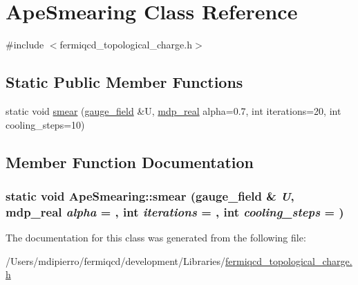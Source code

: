 \hypertarget{class_ape_smearing}{
\section{ApeSmearing Class Reference}
\label{class_ape_smearing}
}


{\ttfamily \#include $<$fermiqcd\_\-topological\_\-charge.h$>$}\subsection*{Static Public Member Functions}
\begin{DoxyCompactItemize}
\item 
static void \hyperlink{class_ape_smearing_ab3f701b052e30d858bac389f639ed9a0}{smear} (\hyperlink{classgauge__field}{gauge\_\-field} \&U, \hyperlink{mdp__global__vars_8h_a049e4c1d4e74d644878a42f9909463e4}{mdp\_\-real} alpha=0.7, int iterations=20, int cooling\_\-steps=10)
\end{DoxyCompactItemize}


\subsection{Member Function Documentation}
\hypertarget{class_ape_smearing_ab3f701b052e30d858bac389f639ed9a0}{
\subsubsection[{smear}]{\setlength{\rightskip}{0pt plus 5cm}static void ApeSmearing::smear ({\bf gauge\_\-field} \& {\em U}, \/  {\bf mdp\_\-real} {\em alpha} = {}, \/  int {\em iterations} = {}, \/  int {\em cooling\_\-steps} = {})}}
\label{class_ape_smearing_ab3f701b052e30d858bac389f639ed9a0}


The documentation for this class was generated from the following file:\begin{DoxyCompactItemize}
\item 
/Users/mdipierro/fermiqcd/development/Libraries/\hyperlink{fermiqcd__topological__charge_8h}{fermiqcd\_\-topological\_\-charge.h}\end{DoxyCompactItemize}
